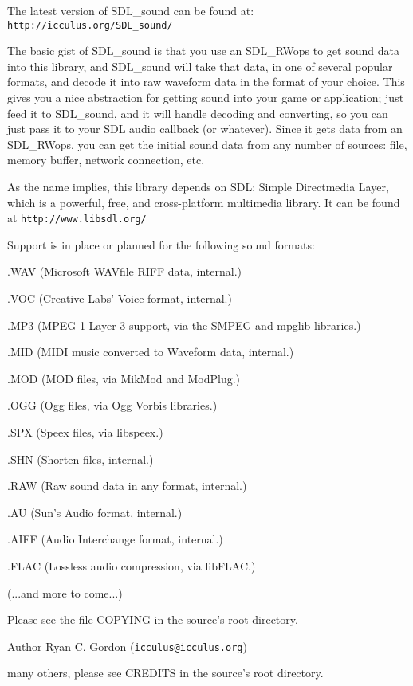 The latest version of S\-D\-L\-\_\-sound can be found at\-: {\tt http\-://icculus.\-org/\-S\-D\-L\-\_\-sound/}

The basic gist of S\-D\-L\-\_\-sound is that you use an S\-D\-L\-\_\-\-R\-Wops to get sound data into this library, and S\-D\-L\-\_\-sound will take that data, in one of several popular formats, and decode it into raw waveform data in the format of your choice. This gives you a nice abstraction for getting sound into your game or application; just feed it to S\-D\-L\-\_\-sound, and it will handle decoding and converting, so you can just pass it to your S\-D\-L audio callback (or whatever). Since it gets data from an S\-D\-L\-\_\-\-R\-Wops, you can get the initial sound data from any number of sources\-: file, memory buffer, network connection, etc.

As the name implies, this library depends on S\-D\-L\-: Simple Directmedia Layer, which is a powerful, free, and cross-\/platform multimedia library. It can be found at {\tt http\-://www.\-libsdl.\-org/}

Support is in place or planned for the following sound formats\-:
\begin{DoxyItemize}
\item .W\-A\-V (Microsoft W\-A\-Vfile R\-I\-F\-F data, internal.)
\item .V\-O\-C (Creative Labs' Voice format, internal.)
\item .M\-P3 (M\-P\-E\-G-\/1 Layer 3 support, via the S\-M\-P\-E\-G and mpglib libraries.)
\item .M\-I\-D (M\-I\-D\-I music converted to Waveform data, internal.)
\item .M\-O\-D (M\-O\-D files, via Mik\-Mod and Mod\-Plug.)
\item .O\-G\-G (Ogg files, via Ogg Vorbis libraries.)
\item .S\-P\-X (Speex files, via libspeex.)
\item .S\-H\-N (Shorten files, internal.)
\item .R\-A\-W (Raw sound data in any format, internal.)
\item .A\-U (Sun's Audio format, internal.)
\item .A\-I\-F\-F (Audio Interchange format, internal.)
\item .F\-L\-A\-C (Lossless audio compression, via lib\-F\-L\-A\-C.)
\end{DoxyItemize}

(...and more to come...)

Please see the file C\-O\-P\-Y\-I\-N\-G in the source's root directory.

\begin{DoxyAuthor}{Author}
Ryan C. Gordon ({\tt icculus@icculus.\-org}) 

many others, please see C\-R\-E\-D\-I\-T\-S in the source's root directory. 
\end{DoxyAuthor}
